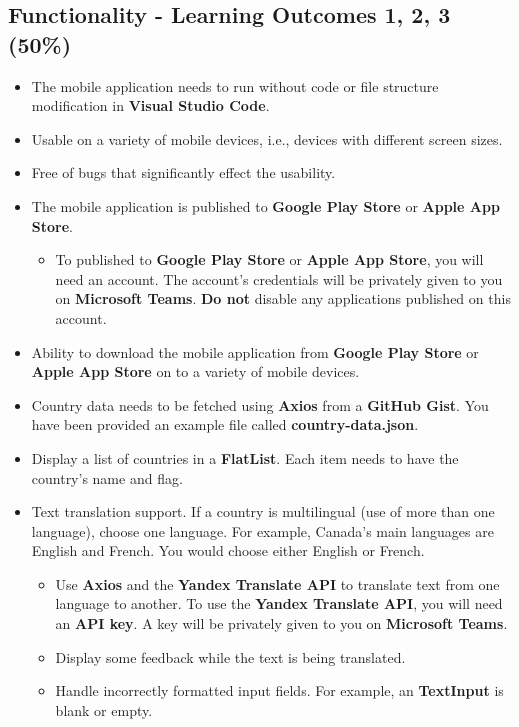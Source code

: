 \documentclass{article}
\begin{document}
\subsection*{Functionality - Learning Outcomes 1, 2, 3 (50\%)}
\begin{itemize}
	\item The mobile application needs to run without code or file structure modification in \textbf{Visual Studio Code}.
	\item Usable on a variety of mobile devices, i.e., devices with different screen sizes.
	\item Free of bugs that significantly effect the usability.
	\item The mobile application is published to \textbf{Google Play Store} or \textbf{Apple App Store}.
	\begin{itemize}
		\item To published to \textbf{Google Play Store} or \textbf{Apple App Store}, you will need an account. The account's credentials will be privately given to you on \textbf{Microsoft Teams}. \textbf{Do not} disable any applications published on this account.
	\end{itemize}
	\item Ability to download the mobile application from \textbf{Google Play Store} or \textbf{Apple App Store} on to a variety of mobile devices.
	\item Country data needs to be fetched using \textbf{Axios} from a \textbf{GitHub Gist}. You have been provided an example file called \textbf{country-data.json}. 
	\item Display a list of countries in a \textbf{FlatList}. Each item needs to have the country's name and flag.
	\item Text translation support. If a country is multilingual (use of more than one language), choose one language. For example, Canada's main languages are English and French. You would choose either English or French.
		\begin{itemize}
			\item Use \textbf{Axios} and the \textbf{Yandex Translate API} to translate text from one language to another. To use the \textbf{Yandex Translate API}, you will need an \textbf{API key}. A key will be privately given to you on \textbf{Microsoft Teams}.
			\item Display some feedback while the text is being translated.
			\item Handle incorrectly formatted input fields. For example, an \textbf{TextInput} is blank or empty.

\end{itemize}
\end{itemize}
\end{document}
